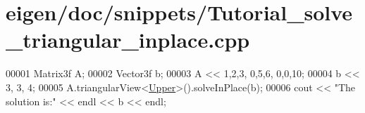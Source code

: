 \hypertarget{eigen_2doc_2snippets_2_tutorial__solve__triangular__inplace_8cpp_source}{}\section{eigen/doc/snippets/\+Tutorial\+\_\+solve\+\_\+triangular\+\_\+inplace.cpp}
\label{eigen_2doc_2snippets_2_tutorial__solve__triangular__inplace_8cpp_source}

\begin{DoxyCode}
00001 Matrix3f A;
00002 Vector3f b;
00003 A << 1,2,3,  0,5,6,  0,0,10;
00004 b << 3, 3, 4;
00005 A.triangularView<\hyperlink{group__enums_gga39e3366ff5554d731e7dc8bb642f83cda6bcb58be3b8b8ec84859ce0c5ac0aaec}{Upper}>().solveInPlace(b);
00006 cout << \textcolor{stringliteral}{"The solution is:"} << endl << b << endl;
\end{DoxyCode}
